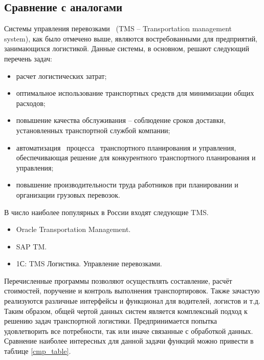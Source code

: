 \subsection{Сравнение с аналогами}
	Системы управления перевозками \, (TMS -- Transportation management \, system), как было отмечено выше, являются востребованными для предприятий, занимающихся логистикой. Данные системы, в основном, решают следующий перечень задач\cite{subj:tms_cmp}:
	\begin{itemize}
		\item расчет логистических затрат;
		\item оптимальное использование транспортных средств для минимизации
		общих расходов;
		\item повышение качества обслуживания -- соблюдение сроков доставки, установленных транспортной службой компании;
		\item автоматизация \, процесса \, транспортного планирования и управления, \, обеспечивающая решение для конкурентного транспортного планирования
		и управления;
		\item повышение производительности труда работников при планировании и
		организации грузовых перевозок.
	\end{itemize}

	\hfill
	
	В число наиболее популярных в России входят следующие TMS.
	\begin{itemize}
		\item Oracle Transportation Management.
		\item SAP TM.
		\item 1С: TMS Логистика. Управление перевозками.
	\end{itemize}

	Перечисленные программы позволяют осуществлять составление, расчёт стоимостей, поручение и контроль выполнения транспортировок. Также зачастую реализуются различные интерфейсы и функционал для водителей, логистов и т.д. Таким образом, общей чертой данных систем является комплексный подход к решению задач транспортной логистики. Предпринимается попытка удовлетворить все потребности, так или иначе связанные с обработкой данных. Сравнение наиболее интересных для данной задачи функций\cite{subj:tms_cmp} можно привести в таблице \ref{cmp_table}.
	
